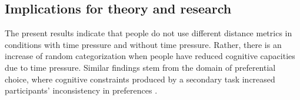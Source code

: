 \documentclass[a4paper,man,natbib]{apa6}
\begin{document}
\subsection{Implications for theory and research}
The present results indicate that people do not use different distance metrics in conditions with time pressure and without time pressure. Rather, there is an increase of random categorization when people have reduced cognitive capacities due to time pressure. Similar findings stem from the domain of preferential choice, where cognitive constraints produced by a secondary task increased participants' inconsistency in preferences \citep{olschewski2018taxing, burks2009cognitive}. 
\end{document}
